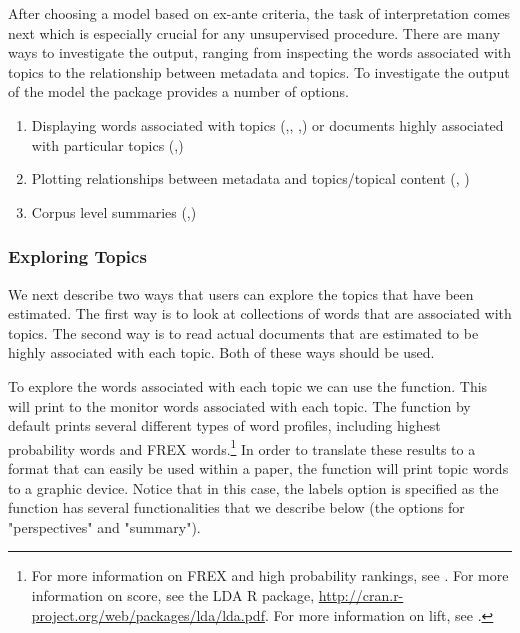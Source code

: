 \documentclass[nojss]{jss}
\begin{document}
After choosing a model based on ex-ante criteria, the task of interpretation comes next which is especially crucial for any unsupervised procedure. There are many ways to investigate the output, ranging from inspecting the words associated with topics to the relationship between metadata and topics. To investigate the output of the model the  package provides a number of options.

\begin{enumerate}
\item Displaying words associated with topics (,, ,) or documents highly associated with particular topics (,)
\item Plotting relationships between metadata and topics/topical content (, )
\item Corpus level summaries (,)
\end{enumerate}

\subsubsection{Exploring Topics}

We next describe two ways that users can explore the topics that have been estimated. The first way is to look at collections of words that are associated with topics. The second way is to read actual documents that are estimated to be highly associated with each topic. Both of these ways should be used.

To explore the words associated with each topic we can use the  function. This will print to the monitor words associated with each topic. The function by default prints several different types of word profiles, including highest probability words and FREX words.\footnote{For more information on FREX and high probability rankings, see \citet{nips2013,STMEdo,ajps,TextComparative}. For more information on score, see the LDA R package, \url{http://cran.r-project.org/web/packages/lda/lda.pdf}. For more information on lift, see \citet{taddy2012multinomial}.}  In order to translate these results to a format that can easily be used within a paper, the  function will print topic words to a graphic device. Notice that in this case, the labels option is specified as the  function has several functionalities that we describe below (the options for "perspectives" and "summary").
\end{document}
